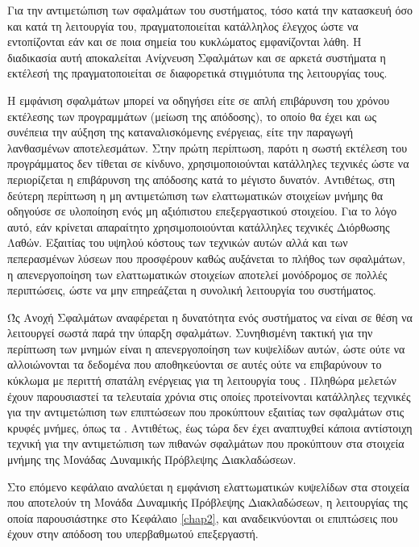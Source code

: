 Για την αντιμετώπιση των σφαλμάτων του συστήματος, τόσο κατά την κατασκευή όσο και κατά τη λειτουργία του, πραγματοποιείται κατάλληλος έλεγχος ώστε να εντοπίζονται εάν και σε ποια σημεία του κυκλώματος εμφανίζονται λάθη. Η διαδικασία αυτή αποκαλείται Ανίχνευση Σφαλμάτων και σε αρκετά συστήματα η εκτέλεσή της πραγματοποιείται σε διαφορετικά στιγμιότυπα της λειτουργίας τους.
\par
Η εμφάνιση σφαλμάτων μπορεί να οδηγήσει είτε σε απλή επιβάρυνση του χρόνου εκτέλεσης των προγραμμάτων (μείωση της απόδοσης), το οποίο θα έχει και ως συνέπεια την αύξηση της καταναλισκόμενης ενέργειας, είτε την παραγωγή λανθασμένων αποτελεσμάτων. Στην πρώτη περίπτωση, παρότι η σωστή εκτέλεση του προγράμματος δεν τίθεται σε κίνδυνο, χρησιμοποιούνται κατάλληλες τεχνικές ώστε να περιορίζεται η επιβάρυνση της απόδοσης κατά το μέγιστο δυνατόν. Αντιθέτως, στη δεύτερη περίπτωση η μη αντιμετώπιση των ελαττωματικών στοιχείων μνήμης θα οδηγούσε σε υλοποίηση ενός μη αξιόπιστου επεξεργαστικού στοιχείου. Για το λόγο αυτό, εάν κρίνεται απαραίτητο χρησιμοποιούνται κατάλληλες τεχνικές Διόρθωσης Λαθών. Εξαιτίας του υψηλού κόστους των τεχνικών αυτών αλλά και των πεπερασμένων λύσεων που προσφέρουν καθώς αυξάνεται το πλήθος των σφαλμάτων, η απενεργοποίηση των ελαττωματικών στοιχείων αποτελεί μονόδρομος σε πολλές περιπτώσεις, ώστε να μην επηρεάζεται η συνολική λειτουργία του συστήματος.
\par
Ώς Ανοχή Σφαλμάτων αναφέρεται η δυνατότητα ενός συστήματος να είναι σε θέση να λειτουργεί σωστά παρά την ύπαρξη σφαλμάτων. Συνηθισμένη τακτική για την περίπτωση των μνημών είναι η απενεργοποίηση των κυψελίδων αυτών, ώστε ούτε να αλλοιώνονται τα δεδομένα που αποθηκεύονται σε αυτές ούτε να επιβαρύνουν το κύκλωμα με περιττή σπατάλη ενέργειας για τη λειτουργία τους \cite{wilkerson2008trading, koren2010fault}. Πληθώρα μελετών έχουν παρουσιαστεί τα τελευταία χρόνια στις οποίες προτείνονται κατάλληλες τεχνικές για την αντιμετώπιση των επιπτώσεων που προκύπτουν εξαιτίας των σφαλμάτων στις κρυφές μνήμες, όπως τα \cite{wilkerson2008trading, shirvani1999padded, ansari2009zerehcache, koh2009salvage, lee2011defcam, choi2011matching, keramidas2014spatial, mavropoulos2015defect}. Αντιθέτως, έως τώρα δεν έχει αναπτυχθεί κάποια αντίστοιχη τεχνική για την αντιμετώπιση των πιθανών σφαλμάτων που προκύπτουν στα στοιχεία μνήμης της Μονάδας Δυναμικής Πρόβλεψης Διακλαδώσεων.
\par
Στο επόμενο κεφάλαιο αναλύεται η εμφάνιση ελαττωματικών κυψελίδων στα στοιχεία που αποτελούν τη Μονάδα Δυναμικής Πρόβλεψης Διακλαδώσεων, η λειτουργίας της οποία παρουσιάστηκε στο Κεφάλαιο \ref{chap2}, και αναδεικνύονται οι επιπτώσεις που έχουν στην απόδοση του υπερβαθμωτού επεξεργαστή.

